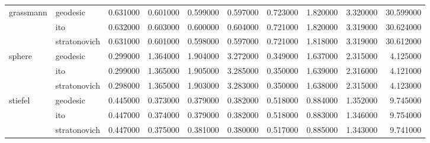 \begin{tabular}{llrrrrrrrr}
\cline{1-10}
\multirow[t]{3}{*}{grassmann} & geodesic & 0.631000 & 0.601000 & 0.599000 & 0.597000 & 0.723000 & 1.820000 & 3.320000 & 30.599000 \\
 & ito & 0.632000 & 0.603000 & 0.600000 & 0.604000 & 0.721000 & 1.820000 & 3.319000 & 30.624000 \\
 & stratonovich & 0.631000 & 0.601000 & 0.598000 & 0.597000 & 0.721000 & 1.818000 & 3.319000 & 30.612000 \\
\cline{1-10}
\multirow[t]{3}{*}{sphere} & geodesic & 0.299000 & 1.364000 & 1.904000 & 3.272000 & 0.349000 & 1.637000 & 2.315000 & 4.125000 \\
 & ito & 0.299000 & 1.365000 & 1.905000 & 3.285000 & 0.350000 & 1.639000 & 2.316000 & 4.121000 \\
 & stratonovich & 0.298000 & 1.365000 & 1.903000 & 3.283000 & 0.350000 & 1.638000 & 2.315000 & 4.123000 \\
\cline{1-10}
\multirow[t]{3}{*}{stiefel} & geodesic & 0.445000 & 0.373000 & 0.379000 & 0.382000 & 0.518000 & 0.884000 & 1.352000 & 9.745000 \\
 & ito & 0.447000 & 0.374000 & 0.379000 & 0.382000 & 0.518000 & 0.883000 & 1.346000 & 9.754000 \\
 & stratonovich & 0.447000 & 0.375000 & 0.381000 & 0.380000 & 0.517000 & 0.885000 & 1.343000 & 9.741000 \\
\cline{1-10}
\bottomrule
\end{tabular}
